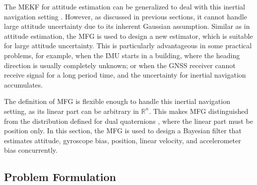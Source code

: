 The MEKF for attitude estimation can be generalized to deal with this inertial navigation setting \cite{sola2017quaternion}.
However, as discussed in previous sections, it cannot handle large attitude uncertainty due to its inherent Gaussian assumption.
Similar as in attitude estimation, the MFG is used to design a new estimator, which is suitable for large attitude uncertainty.
This is particularly advantageous in some practical problems, for example, when the IMU starts in a building, where the heading direction is usually completely unknown; or when the GNSS receiver cannot receive signal for a long period time, and the uncertainty for inertial navigation accumulates.

The definition of MFG is flexible enough to handle this inertial navigation setting, as its linear part can be arbitrary in $\mathbb{R}^n$.
This makes MFG distinguished from the distribution defined for dual quaternions \cite{li2019geometry,li2020unscented}, where the linear part must be position only.
In this section, the MFG is used to design a Bayesian filter that estimates attitude, gyroscope bias, position, linear velocity, and accelerometer bias concurrently.

\subsection{Problem Formulation}

